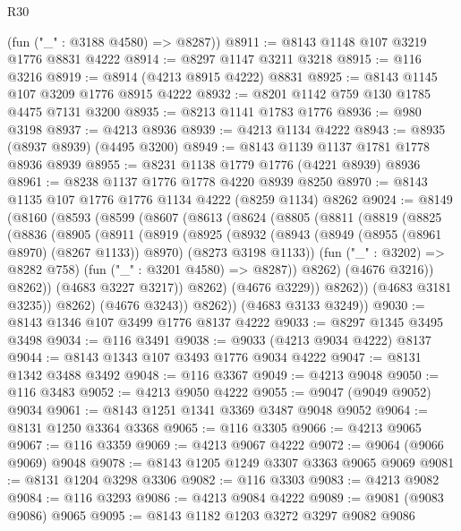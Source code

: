 \begin{lexlean}{R30}
\begin{coremodule}
{{{{{      (fun ("_" : @3188 @4580) => @8287))
@8911 := @8143 @1148 @107 @3219 @1776 @8831 @4222
@8914 := @8297 @1147 @3211 @3218
@8915 := @116 @3216
@8919 := @8914 (@4213 @8915 @4222) @8831
@8925 := @8143 @1145 @107 @3209 @1776 @8915 @4222
@8932 := @8201 @1142 @759 @130 @1785 @4475 @7131 @3200
@8935 := @8213 @1141 @1783 @1776
@8936 := @980 @3198
@8937 := @4213 @8936
@8939 := @4213 @1134 @4222
@8943 := @8935 (@8937 @8939) (@4495 @3200)
@8949 := @8143 @1139 @1137 @1781 @1778 @8936 @8939
@8955 := @8231 @1138 @1779 @1776 (@4221 @8939) @8936
@8961 := @8238 @1137 @1776 @1778 @4220 @8939 @8250
@8970 := @8143 @1135 @107 @1776 @1776 @1134 @4222 (@8259 @1134) @8262
@9024 := @8149
    (@8160
      (@8593
        (@8599
          (@8607
            (@8613
              (@8624
                (@8805
                  (@8811
                    (@8819
                      (@8825
                        (@8836
                          (@8905
                            (@8911
                              (@8919
                                (@8925
                                  (@8932
                                    (@8943
                                      (@8949 (@8955 (@8961 @8970) (@8267 @1133)) @8970)
                                      (@8273 @3198 @1133))
                                    (fun ("_" : @3202) => @8282 @758)
                                    (fun ("_" : @3201 @4580) => @8287))
                                  @8262)
                                (@4676 @3216))
                              @8262))
                          (@4683 @3227 @3217))
                        @8262)
                      (@4676 @3229))
                    @8262))
                (@4683 @3181 @3235))
              @8262)
            (@4676 @3243))
          @8262))
      (@4683 @3133 @3249))
@9030 := @8143 @1346 @107 @3499 @1776 @8137 @4222
@9033 := @8297 @1345 @3495 @3498
@9034 := @116 @3491
@9038 := @9033 (@4213 @9034 @4222) @8137
@9044 := @8143 @1343 @107 @3493 @1776 @9034 @4222
@9047 := @8131 @1342 @3488 @3492
@9048 := @116 @3367
@9049 := @4213 @9048
@9050 := @116 @3483
@9052 := @4213 @9050 @4222
@9055 := @9047 (@9049 @9052) @9034
@9061 := @8143 @1251 @1341 @3369 @3487 @9048 @9052
@9064 := @8131 @1250 @3364 @3368
@9065 := @116 @3305
@9066 := @4213 @9065
@9067 := @116 @3359
@9069 := @4213 @9067 @4222
@9072 := @9064 (@9066 @9069) @9048
@9078 := @8143 @1205 @1249 @3307 @3363 @9065 @9069
@9081 := @8131 @1204 @3298 @3306
@9082 := @116 @3303
@9083 := @4213 @9082
@9084 := @116 @3293
@9086 := @4213 @9084 @4222
@9089 := @9081 (@9083 @9086) @9065
@9095 := @8143 @1182 @1203 @3272 @3297 @9082 @9086
}}}}}
\end{coremodule}
\end{lexlean}
